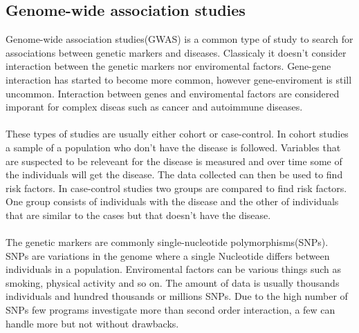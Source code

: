 \documentclass[10pt,a4paper]{article}
\begin{document}
\subsection{Genome-wide association studies}
Genome-wide association studies(GWAS) is a common type of study to search for associations between genetic markers and diseases. Classicaly it doesn't consider interaction between the genetic markers nor enviromental factors. Gene-gene interaction has started to become more common\cite{cordell_detect_review}, however gene-enviroment is still uncommon\cite{gene_enviroment_2013}. Interaction between genes and enviromental factors are considered imporant for complex diseas such as cancer and autoimmune diseases. \cite{cordell_detect_review, gene_enviroment_2013, geira, ra_smoking}\\
\\
These types of studies are usually either cohort or case-control. In cohort studies a sample of a population who don't have the disease is followed. Variables that are suspected to be releveant for the disease is measured and over time some of the individuals will get the disease. The data collected can then be used to find risk factors. In case-control studies two groups are compared to find risk factors. One group consists of individuals with the disease and the other of individuals that are similar to the cases but that doesn't have the disease. \cite{rothman1998modern,mann_observational}\\
\\
The genetic markers are commonly single-nucleotide polymorphisms(SNPs). SNPs are variations in the genome where a single Nucleotide differs between individuals in a population\cite{fareed_snp}. Enviromental factors can be various things such as smoking, physical activity and so on. The amount of data is usually thousands individuals and hundred thousands or millions SNPs. Due to the high number of SNPs few programs investigate more than second order interaction, a few can handle more but not without drawbacks\cite{gwis,high_order_2012,fast_high_order_cluster}.

\end{document}
